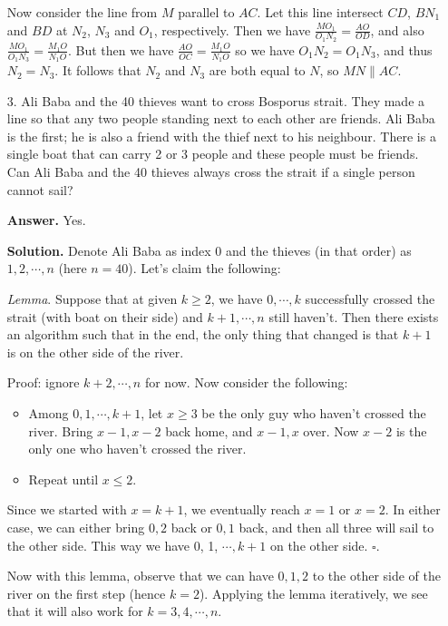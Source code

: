\documentclass[11pt,a4paper]{article}
\begin{document}
\begin{enumerate}
	Now consider the line from $M$ parallel to $AC$. 
	Let this line intersect $CD$, $BN_1$ and $BD$ at $N_2$, $N_3$ and $O_1$, respectively.  
	Then we have $\frac{MO_1}{O_1N_2}=\frac{AO}{OD}$, 
	and also 
	$\frac{MO_1}{O_1N_3}=\frac{M_1O}{N_1O}$. 
	But then we have $\frac{AO}{OC}=\frac{M_1O}{N_1O}$ 
	so we have $O_1N_2=O_1N_3$, and thus $N_2=N_3$. 
	It follows that $N_2$ and $N_3$ are both equal to $N$, so $MN\parallel AC$. 
	
	\item [3.] 
	Ali Baba and the 40 thieves want to cross Bosporus strait. They made a line
	so that any two people standing next to each other are friends. Ali Baba is the
	first; he is also a friend with the thief next to his neighbour. There is a single
	boat that can carry 2 or 3 people and these people must be friends. Can Ali
	Baba and the 40 thieves always cross the strait if a single person cannot sail?
	
	\textbf{Answer.} Yes. 
	
	\textbf{Solution.} Denote Ali Baba as index 0 and the thieves (in that order) as $1, 2, \cdots, n$ (here $n=40$). 
	Let's claim the following: 
	
	\emph{Lemma}. Suppose that at given $k\ge 2$, we have $0, \cdots, k$ successfully crossed the strait (with boat on their side) and $k+1, \cdots, n$ still haven't. 
	Then there exists an algorithm such that in the end, the only thing that changed is that $k+1$ is on the other side of the river. 
	
	Proof: ignore $k+2, \cdots, n$ for now. 
	Now consider the following: 
	\begin{itemize}
		\item Among $0, 1, \cdots, k+1$, let $x\ge 3$ be the only guy who haven't crossed the river. 
		Bring $x-1, x-2$ back home, and $x-1, x$ over. Now $x-2$ is the only one who haven't crossed the river. 
		
		\item Repeat until $x\le 2$. 
	\end{itemize}
    Since we started with $x=k+1$, we eventually reach $x=1$ or $x=2$. 
    In either case, we can either bring $0, 2$ back or $0, 1$ back, and then all three will sail to the other side. 
    This way we have 0, 1, $\cdots, k+1$ on the other side. $\square$. 
    
    Now with this lemma, observe that we can have $0, 1, 2$ to the other side of the river on the first step (hence $k=2$). Applying the lemma iteratively, we see that it will also work for $k=3, 4, \cdots, n$. 
    

\end{enumerate}
\end{document}
